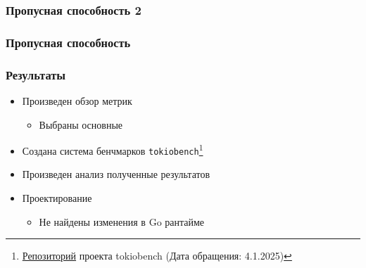 \documentclass{beamer}
\begin{document}
\begin{frame}[fragile]
  \frametitle{Пропусная способность 2}

  \begin{center}
  \end{center}
\end{frame}

\begin{frame}[fragile]
  \frametitle{Пропусная способность}

  \begin{center}
  \end{center}
\end{frame}

\begin{frame}[fragile]
  \frametitle{Результаты}
  \begin{itemize}
    \item Произведен обзор метрик
    \begin{itemize}
      \item Выбраны основные
    \end{itemize}
    \item Создана система бенчмарков \verb|tokiobench|\footnote{\href{https://github.com/IgorErin/tokiobench}{Репозиторий} проекта tokiobench (Дата обращения: 4.1.2025)}
    \item Произведен анализ полученные результатов
    \item Проектирование
    \begin{itemize}
      \item Не найдены изменения в Go рантайме
    \end{itemize}
  \end{itemize}
\end{frame}

\appendix
\end{document}
